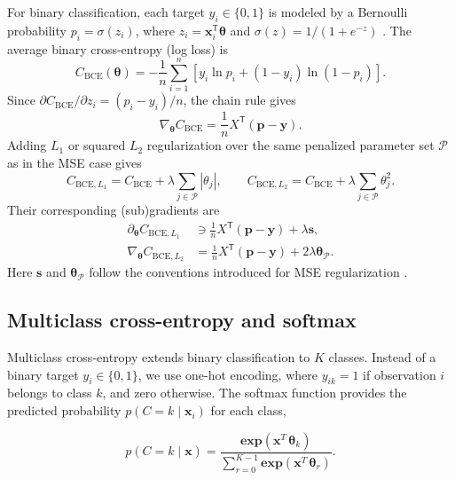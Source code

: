 \documentclass[aps,rmp,reprint,amsmath,amssymb,graphicx,longbibliography]{revtex4-1}
\begin{document}
For binary classification, each target $y_i\in\{0,1\}$ is modeled by a
Bernoulli probability $p_i=\sigma(z_i)$, where
$z_i=\mathbf{x}_i^{\mathsf T}\boldsymbol{\theta}$ and
$\sigma(z)=1/(1+e^{-z})$ \cite{Book_Ch5}. The average binary cross-entropy (log loss) is
\begin{equation}
 C_{\mathrm{BCE}}(\boldsymbol{\theta})=
 -\frac{1}{n}\sum_{i=1}^{n}
 \left[y_i\ln p_i+(1-y_i)\ln(1-p_i)\right].
\end{equation}
Since $\partial C_{\mathrm{BCE}}/\partial z_i=(p_i-y_i)/n$,
the chain rule gives
\begin{equation}
 \nabla_{\boldsymbol{\theta}}C_{\mathrm{BCE}}
 =\frac{1}{n}X^{\mathsf T}(\mathbf p-\mathbf y).
\end{equation}
Adding $L_1$ or squared $L_2$ regularization over the same penalized
parameter set $\mathcal{P}$ as in the MSE case gives
\begin{equation}
 C_{\mathrm{BCE},L_1}=C_{\mathrm{BCE}}
 +\lambda\sum_{j\in\mathcal{P}}|\theta_j|,\qquad
 C_{\mathrm{BCE},L_2}=C_{\mathrm{BCE}}
 +\lambda\sum_{j\in\mathcal{P}}\theta_j^2.
\end{equation}
Their corresponding (sub)gradients are
\begin{align}
 \partial_{\boldsymbol{\theta}}C_{\mathrm{BCE},L_1}
 &\ni \frac{1}{n}X^{\mathsf T}(\mathbf p-\mathbf y)
 +\lambda\mathbf s,\\
 \nabla_{\boldsymbol{\theta}}C_{\mathrm{BCE},L_2}
 &= \frac{1}{n}X^{\mathsf T}(\mathbf p-\mathbf y)
 +2\lambda\boldsymbol{\theta}_{\mathcal{P}}.
\end{align}
Here $\mathbf s$ and $\boldsymbol{\theta}_{\mathcal{P}}$ follow the
conventions introduced for MSE regularization \cite{Book_Ch5}.


\subsection{Multiclass cross-entropy and softmax}
\label{subsec:softmax_cross_entropy}

Multiclass cross-entropy extends binary classification to $K$ classes.
Instead of a binary target $y_i\in\{0,1\}$, we use one-hot encoding,
where $y_{ik}=1$ if observation $i$ belongs to class $k$, and zero
otherwise. The softmax function provides the predicted probability
$p(C=k\mid\mathbf{x}_i)$ for each class,

\begin{equation}
    p(C=k\mid\mathbf{x})=\frac{\mathbf{exp}(\mathbf{x}^T\,\boldsymbol{\theta}_k)}{\sum^{K-1}_{r=0}\mathbf{exp}(\mathbf{x}^T\,\boldsymbol{\theta}_r)}.
\end{equation}
\end{document}
